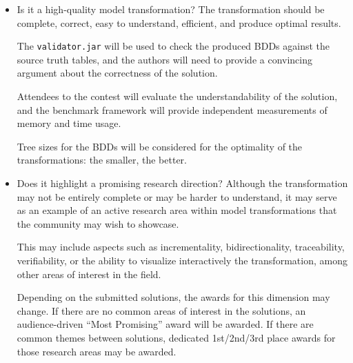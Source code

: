 \documentclass[a4paper]{scrartcl}
\newcommand*{\file}[1]{\texttt{#1}}
\begin{document}
\begin{itemize}
\item Is it a high-quality model transformation? The transformation should be
  complete, correct, easy to understand, efficient, and produce optimal results.

  The \file{validator.jar} will be used to check the produced BDDs against the
  source truth tables, and the authors will need to provide a convincing
  argument about the correctness of the solution.

  Attendees to the contest will evaluate the understandability of the solution,
  and the benchmark framework will provide independent measurements of memory
  and time usage.

  Tree sizes for the BDDs will be considered for the optimality of the
  transformations: the smaller, the better.

\item Does it highlight a promising research direction? Although the
  transformation may not be entirely complete or may be harder to understand, it
  may serve as an example of an active research area within model
  transformations that the community may wish to showcase.

  This may include aspects such as incrementality, bidirectionality,
  traceability, verifiability, or the ability to visualize interactively the
  transformation, among other areas of interest in the field.

  Depending on the submitted solutions, the awards for this dimension may
  change. If there are no common areas of interest in the solutions, an
  audience-driven ``Most Promising'' award will be awarded. If there are common
  themes between solutions, dedicated 1st/2nd/3rd place awards for those
  research areas may be awarded.
\end{itemize}



\end{document}

